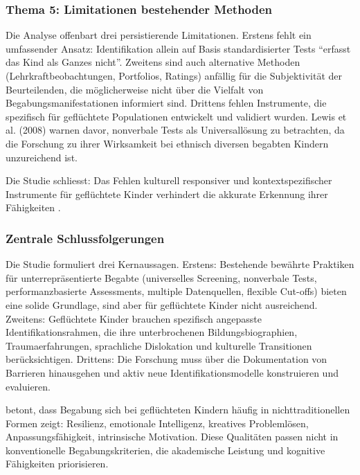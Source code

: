 \documentclass[ngerman, a4paper]{article}
\begin{document}
\subsubsection*{Thema 5: Limitationen bestehender Methoden}

Die Analyse offenbart drei persistierende Limitationen. Erstens fehlt ein
umfassender Ansatz: Identifikation allein auf Basis standardisierter Tests
\enquote{erfasst das Kind als Ganzes nicht}. Zweitens sind auch alternative
Methoden (Lehrkraftbeobachtungen, Portfolios, Ratings) anfällig für die
Subjektivität der Beurteilenden, die möglicherweise nicht über die
Vielfalt von Begabungsmanifestationen informiert sind. Drittens fehlen
Instrumente, die spezifisch für geflüchtete Populationen entwickelt und
validiert wurden. Lewis et al. (2008) warnen davor, nonverbale Tests als
Universallösung zu betrachten, da die Forschung zu ihrer Wirksamkeit bei
ethnisch diversen begabten Kindern unzureichend ist.

Die Studie schliesst: Das Fehlen kulturell responsiver und
kontextspezifischer Instrumente für geflüchtete Kinder verhindert die
akkurate Erkennung ihrer Fähigkeiten \parencite{alodat2025equitable}.

\subsubsection*{Zentrale Schlussfolgerungen}

Die Studie formuliert drei Kernaussagen. Erstens: Bestehende bewährte
Praktiken für unterrepräsentierte Begabte (universelles Screening,
nonverbale Tests, performanzbasierte Assessments, multiple Datenquellen,
flexible Cut-offs) bieten eine solide Grundlage, sind aber für geflüchtete
Kinder nicht ausreichend. Zweitens: Geflüchtete Kinder brauchen spezifisch
angepasste Identifikationsrahmen, die ihre unterbrochenen
Bildungsbiographien, Traumaerfahrungen, sprachliche Dislokation und
kulturelle Transitionen berücksichtigen. Drittens: Die Forschung muss über
die Dokumentation von Barrieren hinausgehen und aktiv neue
Identifikationsmodelle konstruieren und evaluieren.

\textcite{alodat2025equitable} betont, dass Begabung sich bei geflüchteten
Kindern häufig in nichttraditionellen Formen zeigt: Resilienz, emotionale
Intelligenz, kreatives Problemlösen, Anpassungsfähigkeit, intrinsische
Motivation. Diese Qualitäten passen nicht in konventionelle
Begabungskriterien, die akademische Leistung und kognitive Fähigkeiten
priorisieren.
\end{document}

